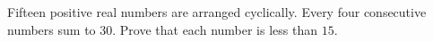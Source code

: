 Fifteen positive real numbers are arranged cyclically. Every four consecutive numbers sum to $30$. Prove that each number is less than $15$.
